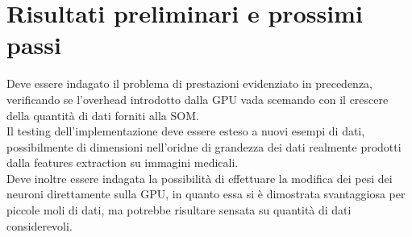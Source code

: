 \section{Risultati preliminari e prossimi passi}
Deve essere indagato il problema di prestazioni evidenziato in precedenza,  verificando se l'overhead introdotto dalla GPU vada scemando con il crescere della quantità di dati forniti alla SOM.\\
Il testing dell'implementazione deve essere esteso a nuovi esempi di dati, possibilmente di dimensioni nell'oridne di grandezza dei dati realmente prodotti dalla features extraction su immagini medicali.\\
Deve inoltre essere indagata la possibilità di effettuare la modifica dei pesi dei neuroni direttamente sulla GPU, in quanto essa si è dimostrata svantaggiosa per piccole moli di dati, ma potrebbe risultare sensata su quantità di dati considerevoli.\\
